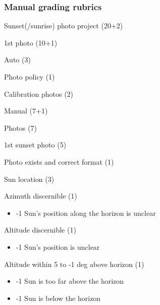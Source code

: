 \documentclass[12pt]{article}
\begin{document}
\subsubsection{Manual grading rubrics}
Sunset(/sunrise) photo project (20+2)
\begin{longenum}
\item 1st photo (10+1)
    \begin{longenum}
    \item Auto (3)
        \begin{longenum}
        \item Photo policy (1)
        \item Calibration photos (2)
        \end{longenum}
    \item Manual (7+1)
        \begin{longenum}
        \item Photos (7)
        	\begin{longenum}
            \item 1st sunset photo (5)
                \begin{longenum}
                \item Photo exists and correct format (1)
                \item Sun location (3)
                    \begin{longenum}
                    \item Azimuth discernible (1)
                        \begin{itemize}
                        \item -1 Sun's position along the horizon is unclear
                        \end{itemize}
                    \item Altitude discernible (1)
                        \begin{itemize}
                        \item -1 Sun's position is unclear
                        \end{itemize}
                    \item Altitude within 5 to -1 deg above horizon (1)
                        \begin{itemize}
                        \item -1 Sun is too far above the horizon
                        \item -1 Sun is below the horizon
                        \end{itemize}

\end{longenum}
\end{longenum}
\end{longenum}
\end{longenum}
\end{longenum}
\end{longenum}
\end{document}
